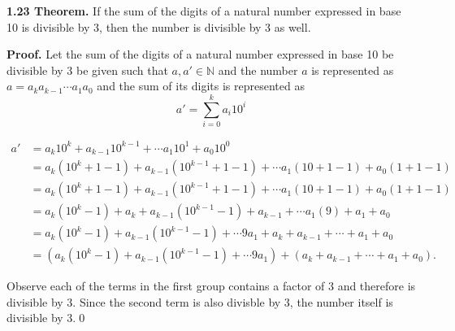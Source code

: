\documentclass[12pt]{article}
\begin{document}
\noindent\textbf{1.23 Theorem.} If the sum of the digits of a natural number expressed in base 10 is divisible by 3, then the number is divisible by 3 as well.

\bigskip

\noindent\textbf{Proof.} Let the sum of the digits of a natural number expressed in base 10 be divisible by 3 be given such that $a,a'\in\mathbb{N}$ and the number $a$ is represented as $a=a_k a_{k-1} \cdots a_1 a_0$ and the sum of its digits is represented as $$a'= \sum_{i=0}^k a_i 10^i$$
 
\begin{align*}
a' &= a_k10^k + a_{k-1}10^{k-1} + \cdots a_1 10^1 + a_0 10^0 \\
&= a_k(10^k +1 -1) + a_{k-1}(10^{k-1} +1 -1) + \cdots a_1(10+1-1) + a_0(1+1-1) \\
&= a_k(10^k +1 -1) + a_{k-1}(10^{k-1} +1 -1) + \cdots a_1(10+1-1) + a_0(1+1-1) \\
&= a_k(10^k -1)+ a_k + a_{k-1}(10^{k-1}-1)+a_{k-1} + \cdots a_1(9)+a_1 + a_0 \\
&= a_k(10^k -1) + a_{k-1}(10^{k-1}-1)+ \cdots 9a_1 +a_k +a_{k-1}+ \cdots +a_1 + a_0 \\
&= ( a_k(10^k -1) + a_{k-1}(10^{k-1}-1)+ \cdots 9a_1 ) + ( a_k +a_{k-1}+ \cdots +a_1 + a_0 ).
\end{align*}

\noindent Observe each of the terms in the first group contains a factor of 3 and therefore is divisible by 3. Since the second term is also divisble by 3, the number itself is divisible by 3.\qed
\end{document}
